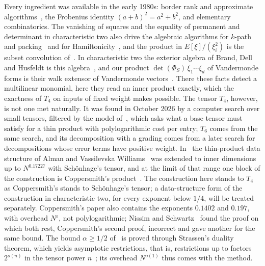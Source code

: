 \documentclass[11pt]{article}
\theoremstyle{definition}
\theoremstyle{remark}
\newcommand{\eps}{\varepsilon}
\begin{document}
Every ingredient was available in the early 1980s: border rank and approximate algorithms~\cite{BCLR79,Bin80,Sch81}, the Frobenius identity $(a+b)^2=a^2+b^2$, and elementary combinatorics. The vanishing of squares and the equality of permanent and determinant in characteristic two also drive the algebraic algorithms for $k$-path and packing~\cite{Kou08,Wil09} and for Hamiltonicity~\cite{Bjo10}, and the product in $E[\xi]/(\xi_i^2)$ is the subset convolution of~\cite{BHKK07}. In characteristic two the exterior algebra of Brand, Dell and Husfeldt is this algebra~\cite[Proposition~13]{BDH18}, and our product $\det(\Phi_S)\,\xi_1\cdots\xi_d$ of Vandermonde forms is their walk extensor of Vandermonde vectors~\cite[Lemma~5]{BDH18}. There these facts detect a multilinear monomial, here they read an inner product exactly, which the exactness of $T_4$ on inputs of fixed weight makes possible. The tensor $T_4$, however, is not one met naturally. It was found in October 2026 by a computer search over small tensors, filtered by the model of~\cite{Maj26}, which asks what a base tensor must satisfy for a thin product with polylogarithmic cost per entry; $T_6$ comes from the same search, and its decomposition with a grading comes from a later search for decompositions whose error terms have positive weight. In~\cite{Maj26} the thin-product data structure of Alman and Vassilevska Williams~\cite{AV26} was extended to inner dimensions up to $N^{0.17227}$ with Schönhage's tensor, and at the limit of that range one block of the construction is Coppersmith's product~\cite[Section~8]{Maj26}. The construction here stands to $T_4$ as Coppersmith's stands to Schönhage's tensor; a data-structure form of the construction in characteristic two, for every exponent below $1/4$, will be treated separately. Coppersmith's paper also contains the exponents $0.1402$ and $0.197$, with overhead $N^\eps$, not polylogarithmic; Nissim and Schwartz~\cite{NS24} found the proof on which both rest, Coppersmith's second proof, incorrect and gave another for the same bound. The bound $\alpha\ge1/2$ of~\cite{AvBZ26} is proved through Strassen's duality theorem, which yields asymptotic restrictions, that is, restrictions up to factors $2^{o(n)}$ in the tensor power $n$~\cite{AvBZ26}; its overhead $N^{o(1)}$ thus comes with the method.
\end{document}
